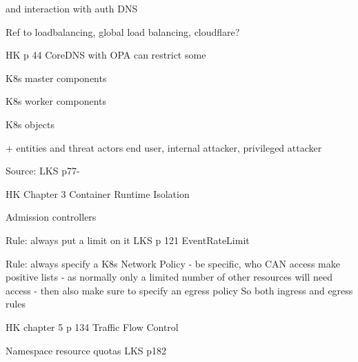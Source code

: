 \documentclass[Screen16to9,17pt]{foils}
\begin{document}

\begin{list2}
\item and interaction with auth DNS
\end{list2}

Ref to loadbalancing, global load balancing, cloudflare?

HK p 44 CoreDNS with OPA can restrict some


\begin{list2}
\item
\end{list2}


\begin{list2}
\item K8s master components
\item K8s worker components
\item K8s objects
\end{list2}

+ entities and threat actors end user, internal attacker, privileged attacker

Source: LKS p77-





\begin{list2}
\item HK Chapter 3 Container Runtime Isolation
\end{list2}



\begin{list2}
\item Admission controllers
\end{list2}

Rule: always put a limit on it
LKS p 121 EventRateLimit


Rule: always specify a K8s Network Policy - be specific, who CAN access
make positive lists - as normally only a limited number of other resources will need access
- then also make sure to specify an egress policy
So both ingress and egress rules

HK chapter 5 p 134 Traffic Flow Control


Namespace resource quotas LKS p182

\end{document}
